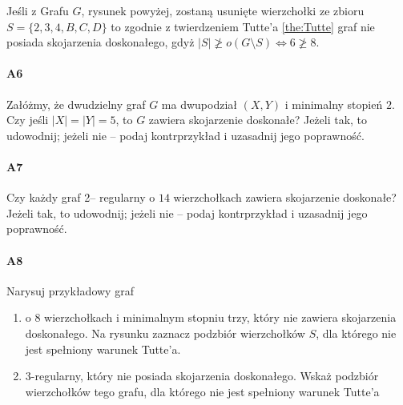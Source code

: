 Jeśli z Grafu $G$, rysunek powyżej, zostaną usunięte wierzchołki ze zbioru $S=\{2,3,4,B,C,D\}$ to zgodnie z twierdzeniem Tutte'a \ref{the:Tutte} graf nie posiada skojarzenia doskonałego, gdyż $|S|\not \geq o(G\setminus S)\Leftrightarrow 6 \not \geq 8$. 

\paragraph{A6} Załóżmy, że dwudzielny graf $G$ ma dwupodział $(X, Y )$ i minimalny stopień $2$. Czy jeśli $|X| = |Y | = 5$, to $G$ zawiera skojarzenie doskonałe? Jeżeli tak, to udowodnij; jeżeli nie – podaj kontrprzykład i uzasadnij jego poprawność.

\paragraph{A7} Czy każdy graf 2– regularny o $14$ wierzchołkach zawiera skojarzenie doskonałe? Jeżeli tak, to udowodnij; jeżeli nie – podaj kontrprzykład i uzasadnij jego poprawność.


\paragraph{A8}
Narysuj przykładowy graf 
\begin{enumerate}[label=\alph*)]
\item o 8 wierzchołkach i minimalnym stopniu trzy, który nie zawiera skojarzenia doskonałego. Na rysunku zaznacz podzbiór wierzchołków $S$, dla którego nie jest spełniony warunek Tutte'a.
\item 3-regularny, który nie posiada skojarzenia doskonałego. Wskaż podzbiór wierzchołków tego grafu, dla którego nie jest spełniony warunek Tutte'a
\end{enumerate}

